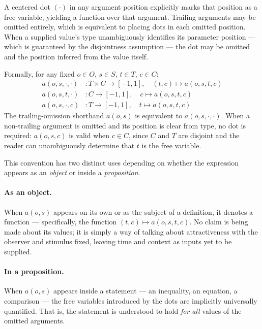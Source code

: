 \begin{definition}
A centered dot $(\cdot)$ in any argument position explicitly marks that position as a free variable, yielding a function over that argument.
Trailing arguments may be omitted entirely, which is equivalent to placing dots in each omitted position.
When a supplied value's type unambiguously identifies its parameter position --- which is guaranteed by the disjointness assumption --- the dot may be omitted and the position inferred from the value itself.

Formally, for any fixed $o \in O$, $s \in S$, $t \in T$, $c \in C$:
\begin{align*}
  a(o, s, \cdot, \cdot) &: T \times C \to [-1,1], \quad (t, c) \mapsto a(o, s, t, c) \\
  a(o, s, t, \cdot) &: C \to [-1,1], \quad c \mapsto a(o, s, t, c) \\
  a(o, s, \cdot, c) &: T \to [-1,1], \quad t \mapsto a(o, s, t, c)
\end{align*}
The trailing-omission shorthand $a(o, s)$ is equivalent to $a(o, s, \cdot, \cdot)$.
When a non-trailing argument is omitted and its position is clear from type, no dot is required: $a(o, s, c)$ is valid when $c \in C$, since $C$ and $T$ are disjoint and the reader can unambiguously determine that $t$ is the free variable.
\end{definition}

This convention has two distinct uses depending on whether the expression appears as an \emph{object} or inside a \emph{proposition}.

\paragraph{As an object.}
When $a(o, s)$ appears on its own or as the subject of a definition, it denotes a function --- specifically, the function $(t, c) \mapsto a(o, s, t, c)$.
No claim is being made about its values; it is simply a way of talking about attractiveness with the observer and stimulus fixed, leaving time and context as inputs yet to be supplied.

\paragraph{In a proposition.}
When $a(o, s)$ appears inside a statement --- an inequality, an equation, a comparison --- the free variables introduced by the dots are implicitly universally quantified.
That is, the statement is understood to hold \emph{for all} values of the omitted arguments.

